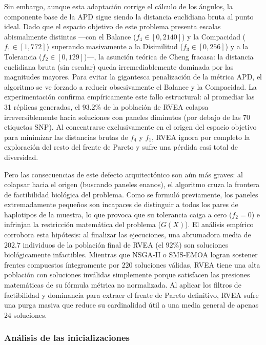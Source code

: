 Sin embargo, aunque esta adaptación corrige el cálculo de los ángulos, la componente base de la APD sigue siendo la distancia euclidiana bruta al punto ideal. Dado que el espacio objetivo de este problema presenta escalas abismalmente distintas —con el Balance ($f_4 \in [0, 2140]$) y la Compacidad ($f_1 \in [1, 772]$) superando masivamente a la Disimilitud ($f_3 \in [0, 256]$) y a la Tolerancia ($f_2 \in [0, 129]$)—, la asunción teórica de Cheng fracasa: la distancia euclidiana bruta (sin escalar) queda irremediablemente dominada por las magnitudes mayores. Para evitar la gigantesca penalización de la métrica APD, el algoritmo se ve forzado a reducir obsesivamente el Balance y la Compacidad. La experimentación confirma empíricamente este fallo estructural: al promediar las 31 réplicas generadas, el $93.2\%$ de la población de RVEA colapsa irreversiblemente hacia soluciones con paneles diminutos (por debajo de las 70 etiquetas SNP). Al concentrarse exclusivamente en el origen del espacio objetivo para minimizar las distancias brutas de $f_4$ y $f_1$, RVEA ignora por completo la exploración del resto del frente de Pareto y sufre una pérdida casi total de diversidad.

Pero las consecuencias de este defecto arquitectónico son aún más graves: al colapsar hacia el origen (buscando paneles enanos), el algoritmo cruza la frontera de factibilidad biológica del problema. Como se formuló previamente, los paneles extremadamente pequeños son incapaces de distinguir a todos los pares de haplotipos de la muestra, lo que provoca que su tolerancia caiga a cero ($f_2 = 0$) e infrinjan la restricción matemática del problema ($G(X)$). El análisis empírico corrobora esta hipótesis: al finalizar las ejecuciones, una abrumadora media de $202.7$ individuos de la población final de RVEA (el $92\%$) son soluciones biológicamente infactibles. Mientras que NSGA-II o SMS-EMOA logran sostener frentes compuestos íntegramente por $220$ soluciones válidas, RVEA tiene una alta población con soluciones inválidas simplemente porque satisfacen las presiones matemáticas de su fórmula métrica no normalizada. Al aplicar los filtros de factibilidad y dominancia para extraer el frente de Pareto definitivo, RVEA sufre una purga masiva que reduce su cardinalidad útil a una media general de apenas $24$ soluciones.

\subsubsection{Análisis de las inicializaciones}

